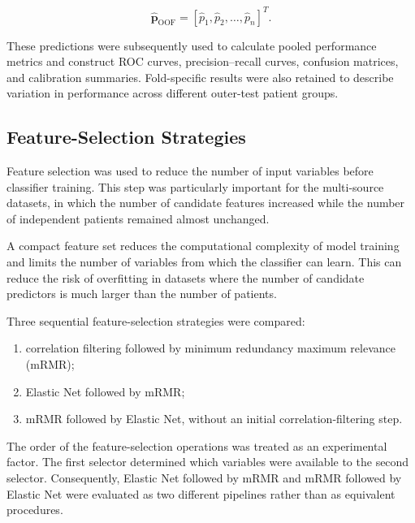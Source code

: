 \documentclass[12pt,twocolumn]{article}
\begin{document}
\begin{equation}
\widehat{\mathbf{p}}_{\mathrm{OOF}}
=
\left[
\widehat{p}_1,
\widehat{p}_2,
\ldots,
\widehat{p}_n
\right]^T.
\label{eq:oof_predictions}
\end{equation}

These predictions were subsequently used to calculate pooled
performance metrics and construct ROC curves, precision--recall
curves, confusion matrices, and calibration summaries. Fold-specific
results were also retained to describe variation in performance across
different outer-test patient groups.










\subsection{Feature-Selection Strategies}
\label{subsec:feature_selection}

Feature selection was used to reduce the number of input variables
before classifier training. This step was particularly important for
the multi-source datasets, in which the number of candidate features
increased while the number of independent patients remained almost
unchanged.

A compact feature set reduces the computational complexity of model
training and limits the number of variables from which the classifier
can learn. This can reduce the risk of overfitting in datasets where
the number of candidate predictors is much larger than the number of
patients.

Three sequential feature-selection strategies were compared:

\begin{enumerate}
    \item correlation filtering followed by minimum redundancy
    maximum relevance (mRMR);

    \item Elastic Net followed by mRMR;

    \item mRMR followed by Elastic Net, without an initial
    correlation-filtering step.
\end{enumerate}

The order of the feature-selection operations was treated as an
experimental factor. The first selector determined which variables
were available to the second selector. Consequently, Elastic Net
followed by mRMR and mRMR followed by Elastic Net were evaluated as
two different pipelines rather than as equivalent procedures.
\end{document}
